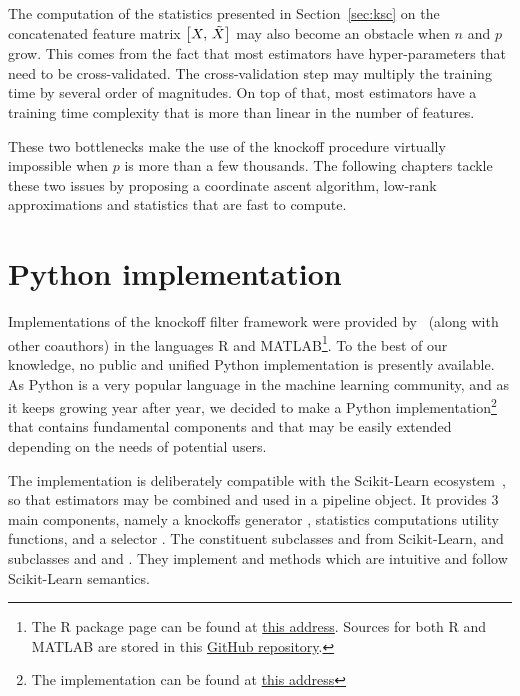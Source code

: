 The computation of the statistics presented in Section~\ref{sec:ksc}
on the concatenated feature matrix $\big[ X,\, \tilde{X} \big]$ may also become an obstacle when $n$ and $p$ grow.
This comes from the fact that most estimators have hyper-parameters that need to be cross-validated.
The cross-validation step may multiply the training time by several order of magnitudes.
On top of that, most estimators have a training time complexity that is more than linear in the number of features.

\bigbreak
These two bottlenecks make the use of the knockoff procedure
virtually impossible when $p$ is more than a few thousands.
The following chapters tackle these two issues by proposing
a coordinate ascent algorithm, low-rank approximations
and statistics that are fast to compute.

\section{Python implementation}\label{sec:python_implementation}

Implementations of the knockoff filter framework were provided by~\cite{fixed_x_knockoffs, model_x_knockoffs}
(along with other coauthors) in the languages R and MATLAB\footnote{
    The R package page can be found at
    \href{https://cran.r-project.org/web/packages/knockoff/index.html}{this address}.
    Sources for both R and MATLAB are stored in this
    \href{https://github.com/msesia/knockoff-filter}{GitHub repository}.
}.
To the best of our knowledge, no public and unified Python implementation is presently available.
As Python is a very popular language in the machine learning community,
and as it keeps growing year after year,
we decided to make a Python implementation\footnote{
    The implementation can be found at
    \href{}{this address}
} that contains fundamental components and that may be easily extended
depending on the needs of potential users.

The implementation is deliberately compatible with the Scikit-Learn ecosystem~\citep{sklearn},
so that estimators may be combined and used in a pipeline object.
It provides 3 main components,
namely a knockoffs generator ,
statistics computations utility functions,
and a selector .
The constituent  subclasses
 and  from Scikit-Learn,
and  subclasses
and  and .
They implement  and  methods which are intuitive and follow Scikit-Learn semantics.

